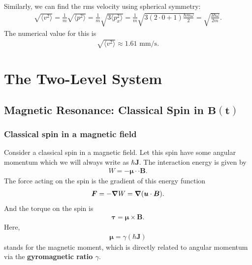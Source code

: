 \documentclass{book}
\theoremstyle{definition}
\newcommand{\f}[2]{\frac{#1}{#2}}
\begin{document}
Similarly, we can find the rms velocity using spherical symmetry:
\begin{align*}
\sqrt{\langle v^2 \rangle} = \f{1}{m}\sqrt{\langle p^2 \rangle} = \f{1}{m}\sqrt{3\langle p_x^2 \rangle} = \f{1}{m}\sqrt{3(2\cdot 0 + 1) \f{\hbar m \omega}{2}} = \sqrt{\f{3\hbar \omega}{2m}}.
\end{align*}
The numerical value for this is
\begin{align*}
\sqrt{\langle v^2 \rangle} \approx 1.61 \text{ mm/s}.
\end{align*}












\chapter{The Two-Level System}









\section{Magnetic Resonance: Classical Spin in $\mathbf{{B}(t)}$}





\subsection{Classical spin in a magnetic field}

Consider a classical spin in a magnetic field. Let this spin have some angular momentum which we will always write as $\hbar \bm{J}$. The interaction energy is given by 
\begin{align*}
	W = -\bm{\mu} \cdot \cdot \bm{B}.
\end{align*} 
The force acting on the spin is the gradient of this energy function
\begin{align*}
	\bm{F} = -\grad W = \grad (\bm{u}\cdot \bm{B}).
\end{align*}
And the torque on the spin is 
\begin{align*}
	\bm{\tau} = \bm{\mu}\times \bm{B}.
\end{align*}
Here, 
\begin{align*}
	\bm{\mu} = \gamma (\hbar \bm{J})
\end{align*}
stands for the magnetic moment, which is directly related to angular momentum via the \textbf{gyromagnetic ratio $\gamma$}.
\end{document}
